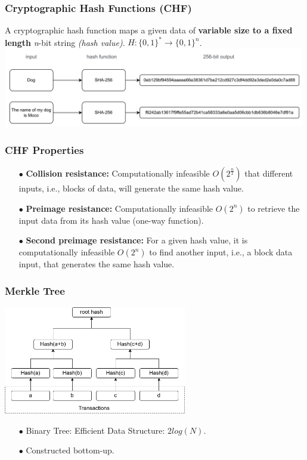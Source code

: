 \documentclass{beamer}
\begin{document}
\begin{frame}
	\frametitle{Cryptographic Hash Functions (CHF)}
	A cryptographic hash function maps a given data of \textbf{variable size to a fixed length} \emph{n}-bit string \textit{(hash value)}. $ H : \{0,1\}^* \to \{0,1\}^n $.
	\linebreak
	\linebreak
	\includegraphics[width=0.99\textwidth,center]{chf}					
\end{frame}

\begin{frame}
	\frametitle{CHF Properties}
	\begin{itemize}
		\item[$\bullet$] \textbf{Collision resistance:} Computationally infeasible $ O(2^\frac{n}{2})$ that different inputs, i.e., blocks of data, will generate the same hash value.\linebreak
		\item[$\bullet$] \textbf{Preimage resistance:} Computationally infeasible $ O(2^n)$ to retrieve the input data from its hash value (one-way function).\linebreak
		\item[$\bullet$] \textbf{Second preimage resistance:} For a given hash value, it is computationally infeasible $ O(2^n) $ to find another input, i.e., a block data input, that generates the same hash value.
	\end{itemize}		
\end{frame}


\begin{frame}
	\frametitle{Merkle Tree}
	\includegraphics[width=0.6\textwidth, center]{../images/merkle}

\begin{itemize}
	\item[$\bullet$] Binary Tree: Efficient Data Structure: $2log (N)$.

	\item[$\bullet$] Constructed bottom-up.
\end{itemize}
\end{frame}
\end{document}
